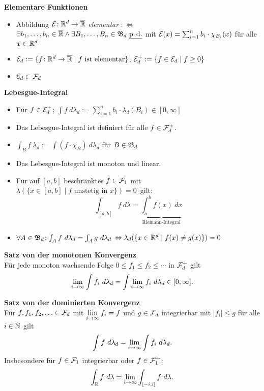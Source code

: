 \textbf{Elementare Funktionen}
\begin{itemize}

\item Abbildung $\mathcal{E}\!: \mathbb{R}^d \to \overline{\mathbb{R}}$ \textit{elementar} $:\Leftrightarrow$\\
  $\exists b_1,\ldots,b_n\in\overline{\mathbb{R}} \wedge \exists B_1,\ldots,B_n\in\mathfrak{B}_d\
  \underline{\operatorname{p.d.}}$ mit $\mathcal{E}(x) = \sum_{i=1}^{n} b_i \cdot \chi_{B_i}(x)$ für alle $x\in\mathbb{R}^d$

\item $\mathcal{E}_d := \{f\!: \mathbb{R}^d \to \overline{\mathbb{R}} \mid f \text{ ist elementar}\}$,
  $\mathcal{E}_d^+ := \{f\in\mathcal{E}_d \mid f\geq 0\}$

\item $\mathcal{E}_d \subset \mathcal{F}_d$
\end{itemize}

\textbf{Lebesgue-Integral}
\begin{itemize}
\item Für $f\in\mathcal{E}_d^+$:
  $\int f~d\lambda_d := \sum_{i=1}^{n} b_i \cdot \lambda_d(B_i) \in [0,\infty]$

\item Das Lebesgue-Integral ist definiert für alle $f\in\mathcal{F}_d^+$.

\item $\int_B f~\lambda_d := \int (f\cdot \chi_B)~d\lambda_d$ für $B\in\mathfrak{B}_d$

\item Das Lebesgue-Integral ist monoton und linear.

\item Für auf $[a,b]$ beschränktes $f \in \mathcal{F}_1$ mit
  \mbox{$\lambda(\{x\in[a,b] \mid f \text{ unstetig in }x\}) = 0$ gilt:}
  \[
    \int_{[a,b]} f~d\lambda =
    \underbrace{\int_{a}^{b}f(x)~dx}_{\text{Riemann-Integral}}
  \]

\item $\forall A\in\mathfrak{B}_d\!: \int_A f~d\lambda_d = \int_A g~d\lambda_d$
  $\Leftrightarrow \lambda_d(\{x\in\mathbb{R}^d \mid f(x) \neq g(x)\}) = 0$
\end{itemize}

\textbf{Satz von der monotonen Konvergenz}\\
Für jede monoton wachsende Folge $0 \leq f_1 \leq f_2 \leq \cdots$
in $\mathcal{F}_d^+$ gilt
\[
  \lim\limits_{i\to\infty}\int f_i~d\lambda_d =
  \int\lim\limits_{i\to\infty} f_i~d\lambda_d \in [0,\infty].
\]

\textbf{Satz von der dominierten Konvergenz}\\
Für $f,f_1,f_2,\ldots\in\mathcal{F}_d$ mit $\lim\limits_{i\to\infty} f_i = f$
und $g\in\mathcal{F}_d$ integrierbar mit $|f_i| \leq g$ für alle $i\in\mathbb{N}$ gilt
\[
  \int f~d\lambda_d = \lim\limits_{i\to\infty} \int f_i~d\lambda_d.
\]
Insbesondere für $f\in\mathcal{F}_1$ integrierbar oder $f\in\mathcal{F}_1^+$:
\[
  \int_{\mathbb{R}} f~d\lambda = \lim\limits_{i\to\infty} \int_{[-i,i]} f~d\lambda.
\]


